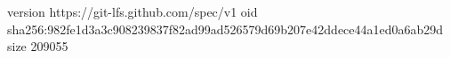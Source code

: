 version https://git-lfs.github.com/spec/v1
oid sha256:982fe1d3a3c908239837f82ad99ad526579d69b207e42ddece44a1ed0a6ab29d
size 209055
